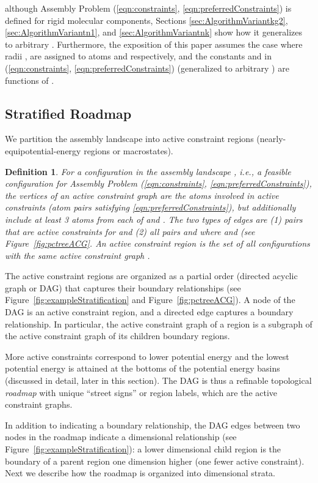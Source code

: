 \documentclass[]{article}
\newtheorem{definition}[theorem]{Definition}
\newcommand{\figref}[1]{Figure~\ref{#1}}
\newcommand{\rmc}{rigid molecular component}
\newcommand{\ctwo}{\ref{eqn:preferredConstraints}}
\newcommand{\cone}{\ref{eqn:constraints}}
\begin{document}
although Assembly Problem (\cone, \ctwo) is defined for  \rmc s, Sections
\ref{sec:AlgorithmVariantkg2}, \ref{sec:AlgorithmVariantn1}, and
\ref{sec:AlgorithmVariantnk} show how it generalizes to arbitrary .
Furthermore, the exposition of this paper assumes the case where radii
,  are assigned to atoms  and  respectively, and the
constants  and  in (\cone, \ctwo) (generalized to arbitrary ) 
are functions of . 

\subsection{Stratified Roadmap}
\label{sec:stratification}
We partition the assembly landscape into active constraint regions
(nearly-equipotential-energy regions or macrostates).
\begin{definition}
\label{def:ACG}
For a configuration  in the assembly landscape , i.e., a feasible
configuration for Assembly Problem (\cone, \ctwo), the vertices of an \emph{active 
		constraint graph} are the atoms involved in active constraints (atom pairs
 satisfying \ctwo), but additionally include at least 3 atoms from each of 
 and . The two types of edges are (1) pairs  that are active constraints 
for  and (2) all pairs  and  where  and  
(see \figref{fig:pctreeACG}. An 
\emph{active constraint region}  is the set of all configurations  with the 
same active constraint graph .
\end{definition}

The active constraint regions are organized as a partial order (directed
acyclic graph or DAG) that captures their boundary relationships (see
\figref{fig:exampleStratification} and \figref{fig:pctreeACG}). A node of the
DAG is an active constraint region, and a directed edge captures a boundary
relationship. In particular, the active constraint graph of a region is a
subgraph of the active constraint graph of its children boundary regions. 

More active constraints correspond to lower potential energy and the lowest
potential energy is attained at the bottoms of the potential energy basins
(discussed in detail, later in this section). The DAG is thus a refinable
topological \emph{roadmap} with unique ``street signs'' or region labels, which
are the active constraint graphs. 

In addition to indicating a boundary relationship, the DAG edges between two
nodes in the roadmap indicate a dimensional relationship (see
\figref{fig:exampleStratification}): a lower dimensional child region is the
boundary of a parent region one dimension higher (one fewer active constraint).
Next we describe how the roadmap is organized into dimensional strata.
\end{document}
